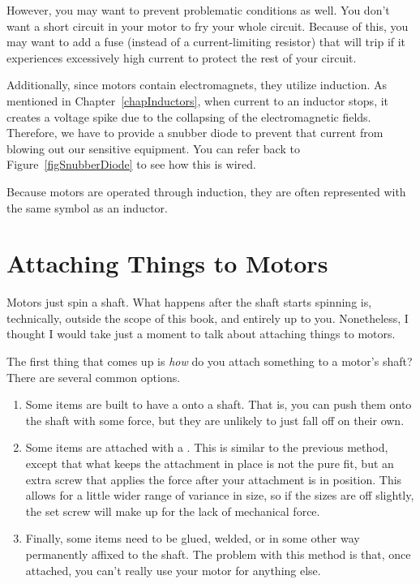 However, you may want to prevent problematic conditions as well.
You don't want a short circuit in your motor to fry your whole circuit.
Because of this, you may want to add a fuse (instead of a current-limiting resistor) that will trip if it experiences excessively high current to protect the rest of your circuit.

Additionally, since motors contain electromagnets, they utilize induction.
As mentioned in Chapter~\ref{chapInductors}, when current to an inductor stops, it creates a voltage spike due to the collapsing of the electromagnetic fields.
Therefore, we have to provide a snubber diode to prevent that current from blowing out our sensitive equipment.
You can refer back to Figure~\ref{figSnubberDiode} to see how this is wired.

Because motors are operated through induction, they are often represented with the same symbol as an inductor.

\section{Attaching Things to Motors}

Motors just spin a shaft.
What happens after the shaft starts spinning is, technically, outside the scope of this book, and entirely up to you.
Nonetheless, I thought I would take just a moment to talk about attaching things to motors.

The first thing that comes up is \emph{how} do you attach something to a motor's shaft?
There are several common options.

\begin{enumerate}
\item Some items are built to have a  onto a shaft.  That is, you can push them onto the shaft with some force, but they are unlikely to just fall off on their own.  
\item Some items are attached with a .  This is similar to the previous method, except that what keeps the attachment in place is not the pure fit, but an extra screw that applies the force after your attachment is in position.  This allows for a little wider range of variance in size, so if the sizes are off slightly, the set screw will make up for the lack of mechanical force.
\item Finally, some items need to be glued, welded, or in some other way permanently affixed to the shaft.  The problem with this method is that, once attached, you can't really use your motor for anything else.
\end{enumerate}

